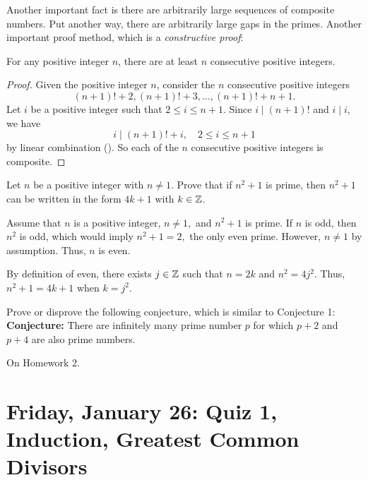 \documentclass{ximera}
\begin{document}
Another important fact is there are arbitrarily large sequences of composite numbers. Put another way, there are arbitrarily large gaps in the primes. Another important proof method, which is a \emph{constructive proof}:

\begin{prop*}[Proposition 1.8]\label{prop:gaps-primes}
 For any positive integer $n$, there are at least $n$ consecutive positive integers.
\end{prop*}
\begin{proof}
 Given the positive integer $n$, consider the $n$ consecutive positive integers \[(n+1)!+2, (n+1)!+3,\dots, (n+1)!+n+1.\]
 Let $i$ be a positive integer such that $2\leq i\leq n+1$. Since $i\mid (n+1)!$ and $i\mid i$, we have \[i\mid(n+1)! +i,\quad 2\leq i\leq n+1\] by linear combination (). So each of the $n$ consecutive positive integers is composite.
\end{proof}

  \begin{br} Let $n$ be a positive integer with $n\neq 1$. Prove that if $n^2+1$ is prime, then $n^2+1$ can be written in the form $4k+1$ with $k\in\mathbb Z$.
  \begin{solution}
   Assume that $n$ is a positive integer, $n\neq 1,$ and $n^2+1$ is prime. If $n$ is odd, then $n^2$ is odd, which would imply $n^2+1=2,$ the only even prime. However, $n\neq 1$ by assumption. Thus, $n$ is even. 

    By definition of even, there exists $j\in\mathbb Z$ such that $n=2k$ and $n^2=4j^2$. Thus, $n^2+1=4k+1$ when $k=j^2.$
  \end{solution}
\end{br}

  \begin{br}
  Prove or disprove the following conjecture, which is similar to Conjecture 1:\\
      \textbf{Conjecture:} There are infinitely many prime number $p$ for which $p+2$ and $p+4$ are also prime numbers.

  
  \begin{solution}
    On Homework 2.
  \end{solution}
    \end{br}



\section{Friday, January 26: Quiz 1, Induction, Greatest Common Divisors}
\end{document}
